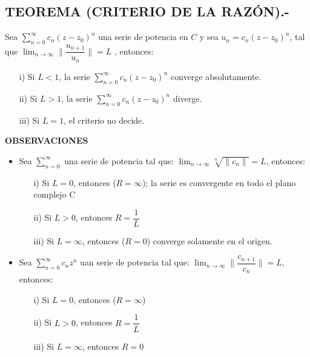 \documentclass[10pt,a4paper]{article}
\begin{document}
\subsection{TEOREMA (CRITERIO DE LA RAZÓN).-}
Sea $\displaystyle{\sum_{n = 0}^{\infty} c_n (z-z_0)^n}$ una serie de potencia en $C$ y sea $u_n = c_n (z-z_0)^n$, tal que $\displaystyle{\lim_{n \to \infty} \parallel \dfrac{u_{n+1}}{u_n}  \parallel = L }$ , entonces:
\begin{itemize}
\item[i)] Si $L<1$, la serie $\displaystyle{\sum_{n = 0}^{\infty} c_n (z-z_0)^n}$ converge absolutamente.
\item[ii)] Si $L>1$, la serie $\displaystyle{\sum_{n = 0}^{\infty} c_n (z-z_0)^n}$ diverge.
\item[iii)] Si $L=1$, el criterio no decide.
\end{itemize}
\textbf{OBSERVACIONES}
\begin{itemize}
\item Sea $\displaystyle{\sum_{n=0}^{\infty}}$ una serie de potencia tal que: $\displaystyle{\lim_{n \to \infty} \sqrt[n]{\parallel c_n \parallel} = L}$, entonces:
\begin{itemize}
\item[i)] Si $L=0$, entonces ($R= \infty$); la serie es convergente en todo el plano complejo C
\item[ii)] Si $L>0$, entonces $\displaystyle{R = \dfrac{1}{L}}$
\item[iii)] Si $L= \infty$, entonces ($R = 0$) converge solamente en el origen.
\end{itemize}
\item Sea $\displaystyle{\sum_{n=0}^{\infty} c_n z^n}$ uan serie de potencia tal que: $\displaystyle{\lim_{n \to \infty} \parallel \dfrac{c_{n+1}}{c_n} \parallel = L}$, entonces: 
\begin{itemize}
\item[i)] Si $L=0$, entonces ($R= \infty$)
\item[ii)] Si $L>0$, entonces $\displaystyle{R = \dfrac{1}{L}}$
\item[iii)] Si $L= \infty$, entonces $R = 0$
\end{itemize}
\end{itemize}
\end{document}

